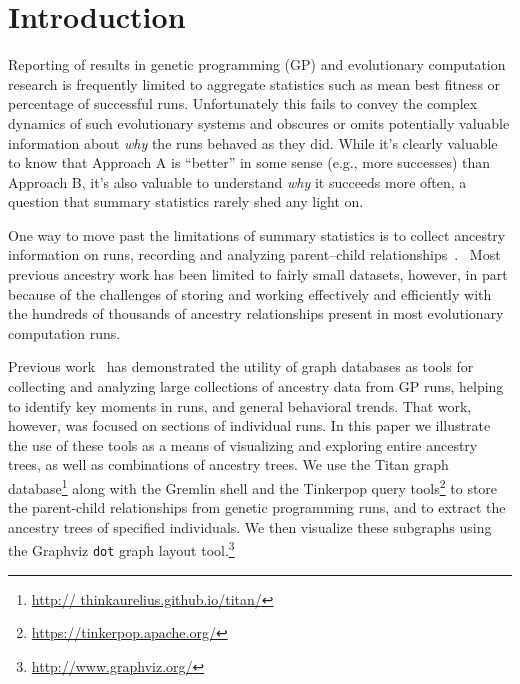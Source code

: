 \documentclass{sig-alternate}
\begin{document}

\printccsdesc


\section{Introduction}
\label{sec:introduction}

Reporting of results in genetic programming (GP) and evolutionary computation 
research is frequently limited to aggregate statistics such as mean best fitness or 
percentage of successful runs. Unfortunately this fails to convey the complex 
dynamics of such evolutionary systems and obscures or omits potentially valuable 
information about \emph{why} the runs behaved as they did. While it's clearly
valuable to know that Approach A is ``better'' in some sense (e.g., more successes)
than Approach B, it's also valuable to understand \emph{why} it succeeds more 
often, a question that summary statistics rarely shed any light on.

One way to move past the limitations of summary statistics is to collect ancestry
information on runs, recording and analyzing parent--child 
relationships~\cite{burlacu2013visualization,cruz2015elicit,hart2001gavel,vaseux2013event}. \
Most previous ancestry
work has been limited to fairly small datasets, however, in part because of the
challenges of storing and working effectively and efficiently with the hundreds of thousands of
ancestry relationships present in most evolutionary computation runs.

Previous work~\cite{McPhee:2015:GPTP} has demonstrated the utility of graph databases as 
tools for collecting and analyzing large collections of ancestry data from GP runs,
helping to identify key moments in runs, and general behavioral trends. That work,
however, was focused on sections of individual runs. In this paper we illustrate the 
use of these tools as a means of visualizing and exploring entire 
ancestry trees, as well as combinations of ancestry trees. 
We use the Titan graph database\footnote{\url{http://
thinkaurelius.github.io/titan/}} along with the Gremlin shell and the Tinkerpop query 
tools\footnote{\url{https://tinkerpop.apache.org/}} to store the parent-child 
relationships from genetic programming runs, and to extract the ancestry trees of 
specified individuals. We then visualize these subgraphs using the Graphviz \texttt{dot} 
graph layout tool.\footnote{\url{http://www.graphviz.org/}}
\end{document}
